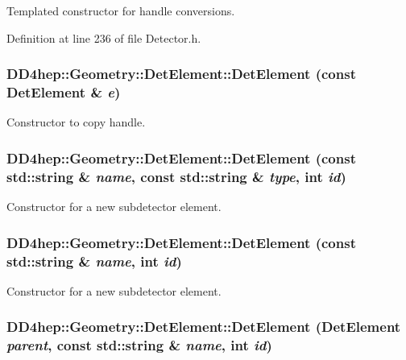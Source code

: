 Templated constructor for handle conversions. 

Definition at line 236 of file Detector.h.\hypertarget{class_d_d4hep_1_1_geometry_1_1_det_element_a450f902a54685339175b04504da0c0fb}{
\subsubsection[{DetElement}]{\setlength{\rightskip}{0pt plus 5cm}DD4hep::Geometry::DetElement::DetElement (const {\bf DetElement} \& {\em e})}}
\label{class_d_d4hep_1_1_geometry_1_1_det_element_a450f902a54685339175b04504da0c0fb}


Constructor to copy handle. \hypertarget{class_d_d4hep_1_1_geometry_1_1_det_element_a0181dbc9668e34c3e3cd2da2ef24d878}{
\subsubsection[{DetElement}]{\setlength{\rightskip}{0pt plus 5cm}DD4hep::Geometry::DetElement::DetElement (const std::string \& {\em name}, \/  const std::string \& {\em type}, \/  int {\em id})}}
\label{class_d_d4hep_1_1_geometry_1_1_det_element_a0181dbc9668e34c3e3cd2da2ef24d878}


Constructor for a new subdetector element. \hypertarget{class_d_d4hep_1_1_geometry_1_1_det_element_ad41b5493b8bd215e6b9124f4c6112f7d}{
\subsubsection[{DetElement}]{\setlength{\rightskip}{0pt plus 5cm}DD4hep::Geometry::DetElement::DetElement (const std::string \& {\em name}, \/  int {\em id})}}
\label{class_d_d4hep_1_1_geometry_1_1_det_element_ad41b5493b8bd215e6b9124f4c6112f7d}


Constructor for a new subdetector element. \hypertarget{class_d_d4hep_1_1_geometry_1_1_det_element_a892a3c4f3429f6ee45aeece59bc538c6}{
\subsubsection[{DetElement}]{\setlength{\rightskip}{0pt plus 5cm}DD4hep::Geometry::DetElement::DetElement ({\bf DetElement} {\em parent}, \/  const std::string \& {\em name}, \/  int {\em id})}}
\label{class_d_d4hep_1_1_geometry_1_1_det_element_a892a3c4f3429f6ee45aeece59bc538c6}


